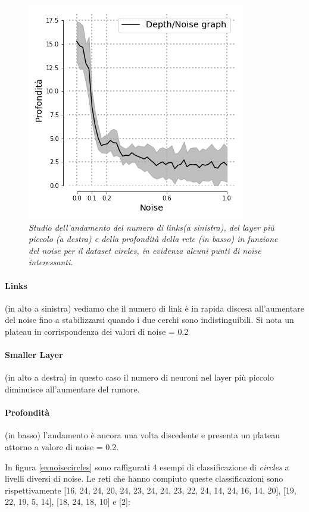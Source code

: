 \documentclass[12pt,a4paper]{report}
\begin{document}
\begin{figure}[H]
 \includegraphics[scale = 0.5]{images/depth_noise_circles}
 \caption {\textit{Studio dell'andamento del numero di links(a sinistra), del layer più piccolo (a destra) e della profondità della rete (in basso) in funzione del noise per il dataset circles, in evidenza alcuni punti di noise interessanti.}}
 \label{noisecircles}
\end{figure}

\paragraph{Links} (in alto a sinistra) vediamo che il numero di link è in rapida discesa all'aumentare del noise fino a stabilizzarsi quando i due cerchi sono indistinguibili. Si nota un plateau in corrispondenza dei valori di noise = 0.2 

\paragraph{Smaller Layer} (in alto a destra) in questo caso il numero di neuroni nel layer più piccolo diminuisce all'aumentare del rumore.

\paragraph{Profondità} (in basso) l'andamento è ancora una volta discedente e presenta un plateau attorno a valore di noise = 0.2.

In figura \ref{exnoisecircles} sono raffigurati 4 esempi di classificazione di \textit{circles} a livelli diversi di noise. Le reti che hanno compiuto queste classificazioni sono rispettivamente [16, 24, 24, 20, 24, 23, 24, 24, 23, 22, 24, 14, 24, 16, 14, 20], [19, 22, 19, 5, 14], [18, 24, 18, 10] e [2]:
\end{document}
